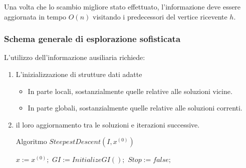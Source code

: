 \documentclass{article}
\begin{document}
Una volta che lo scambio migliore stato effettuato, l'informazione deve essere aggiornata in
tempo $O(n)$ visitando i predecessori del vertice ricevente $h$.

\subsubsection{Schema generale di esplorazione sofisticata}
L'utilizzo dell'informazione ausiliaria richiede:
\begin{enumerate}
    \item L'inizializzazione di strutture dati adatte
    \begin{itemize}
        \item In parte locali, sostanzialmente quelle relative alle soluzioni vicine.
        \item In parte globali, sostanzialmente quelle relative alle soluzioni correnti.
    \end{itemize}
    \item il loro aggiornamento tra le soluzioni e iterazioni successive.

    \begin{algorithm}[H]
        \caption{Algoritmo $SteepestDescent(I,x^{(0)})$}
        \label{alg:steepest_des3}
        \begin{algorithmic}
            \State $x:=x^{(0)};$
            \State $GI:=InitializeGI();$
            \State $Stop := false;$
                        \EndIf
                    \EndIf
                \EndFor
                \Else
                \EndIf
            \EndWhile
        \end{algorithmic}
    \end{algorithm}
\end{enumerate}
\end{document}
